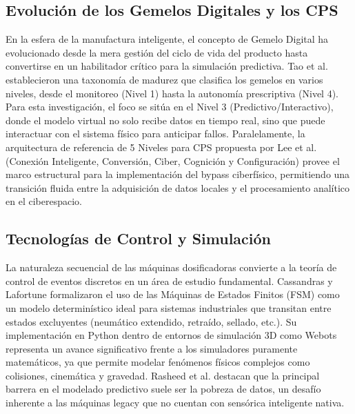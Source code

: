 \subsection*{Evolución de los Gemelos Digitales y los CPS}
En la esfera de la manufactura inteligente, el concepto de Gemelo Digital ha evolucionado desde la mera gestión del ciclo de vida del producto hasta convertirse en un habilitador crítico para la simulación predictiva. Tao et al. \cite{tao2019} establecieron una taxonomía de madurez que clasifica los gemelos en varios niveles, desde el monitoreo (Nivel 1) hasta la autonomía prescriptiva (Nivel 4). Para esta investigación, el foco se sitúa en el Nivel 3 (Predictivo/Interactivo), donde el modelo virtual no solo recibe datos en tiempo real, sino que puede interactuar con el sistema físico para anticipar fallos. Paralelamente, la arquitectura de referencia de 5 Niveles para CPS propuesta por Lee et al. \cite{lee2015} (Conexión Inteligente, Conversión, Ciber, Cognición y Configuración) provee el marco estructural para la implementación del bypass ciberfísico, permitiendo una transición fluida entre la adquisición de datos locales y el procesamiento analítico en el ciberespacio.

\subsection*{Tecnologías de Control y Simulación}
La naturaleza secuencial de las máquinas dosificadoras convierte a la teoría de control de eventos discretos en un área de estudio fundamental. Cassandras y Lafortune \cite{cassandras2021} formalizaron el uso de las Máquinas de Estados Finitos (FSM) como un modelo determinístico ideal para sistemas industriales que transitan entre estados excluyentes (neumático extendido, retraído, sellado, etc.). Su implementación en Python dentro de entornos de simulación 3D como Webots \cite{michel2004} representa un avance significativo frente a los simuladores puramente matemáticos, ya que permite modelar fenómenos físicos complejos como colisiones, cinemática y gravedad. Rasheed et al. \cite{rasheed2020} destacan que la principal barrera en el modelado predictivo suele ser la pobreza de datos, un desafío inherente a las máquinas legacy que no cuentan con sensórica inteligente nativa.

